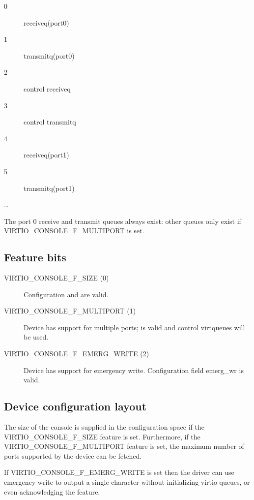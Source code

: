 \begin{description}
\item[0] receiveq(port0)
\item[1] transmitq(port0)
\item[2] control receiveq
\item[3] control transmitq
\item[4] receiveq(port1)
\item[5] transmitq(port1)
\item[\ldots]
\end{description}

The port 0 receive and transmit queues always exist: other queues
only exist if VIRTIO_CONSOLE_F_MULTIPORT is set.

\subsection{Feature bits}\label{sec:Device Types / Console Device / Feature bits}

\begin{description}
\item[VIRTIO_CONSOLE_F_SIZE (0)] Configuration  and 
    are valid.

\item[VIRTIO_CONSOLE_F_MULTIPORT (1)] Device has support for multiple
    ports;  is valid and control virtqueues will be used.

\item[VIRTIO_CONSOLE_F_EMERG_WRITE (2)] Device has support for emergency write.
    Configuration field emerg_wr is valid.
\end{description}

\subsection{Device configuration layout}\label{sec:Device Types / Console Device / Device configuration layout}

  The size of the console is supplied
  in the configuration space if the VIRTIO_CONSOLE_F_SIZE feature
  is set. Furthermore, if the VIRTIO_CONSOLE_F_MULTIPORT feature
  is set, the maximum number of ports supported by the device can
  be fetched.

  If VIRTIO_CONSOLE_F_EMERG_WRITE is set then the driver can use emergency write
  to output a single character without initializing virtio queues, or even
  acknowledging the feature.

